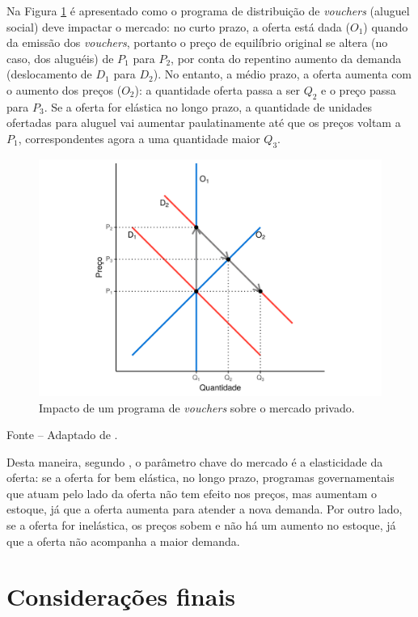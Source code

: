 \documentclass[
	12pt,				%
	oneside,			%
	a4paper,			%
	chapter=TITLE,		%
	section=TITLE,		%
	english,			%
	brazil				%
	]{abntex2}
\newcommand{\bcenter}{\begin{center}}
\newcommand{\ecenter}{\end{center}}
\begin{document}
\begin{refsection}
Na Figura \ref{fig:vouchers2} é apresentado como o programa de distribuição de
\emph{vouchers} (aluguel social) deve impactar o mercado: no curto prazo, a oferta
está dada (\(O_1\)) quando da emissão dos \emph{vouchers}, portanto o preço de
equilíbrio original se altera (no caso, dos aluguéis) de \(P_1\) para \(P_2\), por
conta do repentino aumento da demanda (deslocamento de \(D_1\) para \(D_2\)). No
entanto, a médio prazo, a oferta aumenta com o aumento dos preços (\(O_2\)): a
quantidade oferta passa a ser \(Q_2\) e o preço passa para \(P_3\). Se a oferta for
elástica no longo prazo, a quantidade de unidades ofertadas para aluguel vai
aumentar paulatinamente até que os preços voltam a \(P_1\), correspondentes agora
a uma quantidade maior \(Q_3\).
\begin{figure}[H]

{\centering \includegraphics[width=0.7\linewidth]{images/vouchers2-1} 

}

\caption{Impacto de um programa de \emph{vouchers} sobre o mercado privado.}\label{fig:vouchers2}
\end{figure}
\bcenter

\small Fonte -- Adaptado de \textcite{malpezzi_affordable_2018_2}.
\ecenter

Desta maneira, segundo \textcite{malpezzi_affordable_2018_2}, o parâmetro chave do mercado
é a elasticidade da oferta: se a oferta for bem elástica, no longo prazo,
programas governamentais que atuam pelo lado da oferta não tem efeito nos
preços, mas aumentam o estoque, já que a oferta aumenta para atender a nova
demanda. Por outro lado, se a oferta for inelástica, os preços sobem e não há
um aumento no estoque, já que a oferta não acompanha a maior demanda.

\hypertarget{considerauxe7uxf5es-finais-1}{%
\section{Considerações finais}\label{considerauxe7uxf5es-finais-1}}


\end{refsection}
\end{document}
